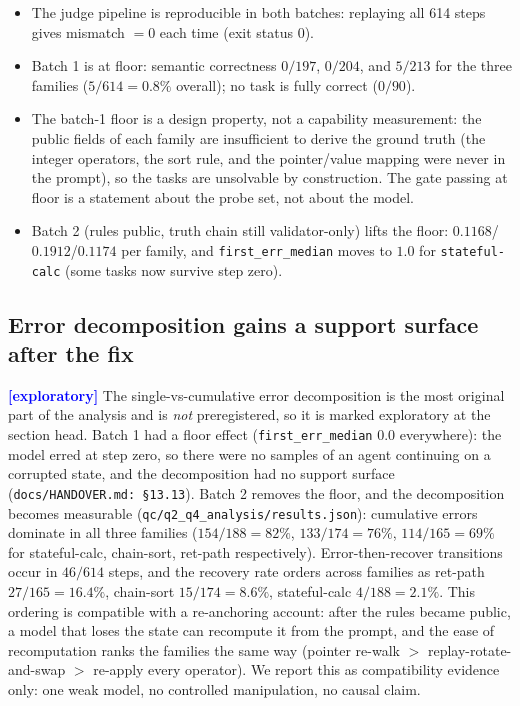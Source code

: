 \documentclass[11pt]{article}
\newcommand{\exploratory}{\textcolor{blue}{\textbf{[exploratory]}}}
\begin{document}
\begin{itemize}
  \item The judge pipeline is reproducible in both batches: replaying all
        614 steps gives mismatch $= 0$ each time (exit status $0$).
  \item Batch 1 is at floor: semantic correctness $0/197$, $0/204$, and
        $5/213$ for the three families ($5/614 = 0.8\%$ overall); no task is
        fully correct ($0/90$).
  \item The batch-1 floor is a design property, not a capability
        measurement: the public fields of each family are insufficient to
        derive the ground truth (the integer operators, the sort rule, and
        the pointer/value mapping were never in the prompt), so the tasks
        are unsolvable by construction. The gate passing at floor is a
        statement about the probe set, not about the model.
  \item Batch 2 (rules public, truth chain still validator-only) lifts the
        floor: $0.1168$/$0.1912$/$0.1174$ per family, and
        \texttt{first\_err\_median} moves to $1.0$ for \texttt{stateful-calc}
        (some tasks now survive step zero).
\end{itemize}

\subsection{Error decomposition gains a support surface after the fix}
\label{sec:etl-decomp}

\exploratory{} The single-vs-cumulative error decomposition is the most
original part of the analysis and is \emph{not} preregistered, so it is
marked exploratory at the section head. Batch 1 had a floor effect
(\texttt{first\_err\_median} $0.0$ everywhere): the model erred at step zero,
so there were no samples of an agent continuing on a corrupted state, and
the decomposition had no support surface (\texttt{docs/HANDOVER.md:\,\S13.13}).
Batch 2 removes the floor, and the decomposition becomes measurable
(\texttt{qc/q2\_q4\_analysis/results.json}): cumulative errors dominate in
all three families ($154/188 = 82\%$, $133/174 = 76\%$, $114/165 = 69\%$ for
stateful-calc, chain-sort, ret-path respectively). Error-then-recover
transitions occur in $46/614$ steps, and the recovery rate orders across
families as ret-path $27/165 = 16.4\%$, chain-sort $15/174 = 8.6\%$,
stateful-calc $4/188 = 2.1\%$. This ordering is compatible with a
re-anchoring account: after the rules became public, a model that loses the
state can recompute it from the prompt, and the ease of recomputation ranks
the families the same way (pointer re-walk $>$ replay-rotate-and-swap $>$
re-apply every operator). We report this as compatibility evidence only:
one weak model, no controlled manipulation, no causal claim.
\end{document}
